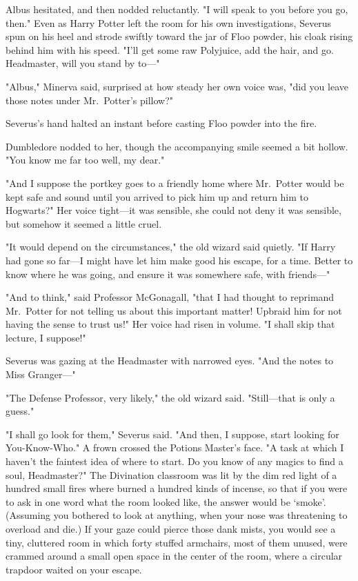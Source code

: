 Albus hesitated, and then nodded reluctantly. "I will speak to you before you
go, then."
\later
Even as Harry Potter left the room for his own investigations, Severus spun on
his heel and strode swiftly toward the jar of Floo powder, his cloak rising
behind him with his speed. "I'll get some raw Polyjuice, add the hair, and go.
Headmaster, will you stand by to---"

"Albus," Minerva said, surprised at how steady her own voice was, "did you
leave those notes under Mr.~Potter's pillow?"

Severus's hand halted an instant before casting Floo powder into the fire.

Dumbledore nodded to her, though the accompanying smile seemed a bit hollow.
"You know me far too well, my dear."

"And I suppose the portkey goes to a friendly home where Mr.~Potter would be
kept safe and sound until you arrived to pick him up and return him to
Hogwarts?" Her voice tight---it was sensible, she could not deny it was
sensible, but somehow it seemed a little cruel.

"It would depend on the circumstances," the old wizard said quietly. "If Harry
had gone so far---I might have let him make good his escape, for a time. Better
to know where he was going, and ensure it was somewhere safe, with friends---"

"And to think," said Professor McGonagall, "that I had thought to reprimand
Mr.~Potter for not telling us about this important matter! Upbraid him for not
having the sense to trust us!" Her voice had risen in volume. "I shall skip
that lecture, I suppose!"

Severus was gazing at the Headmaster with narrowed eyes. "And the notes to Miss
Granger---"

"The Defense Professor, very likely," the old wizard said. "Still---that is
only a guess."

"I shall go look for them," Severus said. "And then, I suppose, start looking
for You-Know-Who." A frown crossed the Potions Master's face. "A task at which
I haven't the faintest idea of where to start. Do you know of any magics to
find a soul, Headmaster?"
\later
The Divination classroom was lit by the dim red light of a hundred small fires
where burned a hundred kinds of incense, so that if you were to ask in one word
what the room looked like, the answer would be `smoke'. (Assuming you bothered
to look at anything, when your nose was threatening to overload and die.) If
your gaze could pierce those dank mists, you would see a tiny, cluttered room
in which forty stuffed armchairs, most of them unused, were crammed around a
small open space in the center of the room, where a circular trapdoor waited on
your escape.

